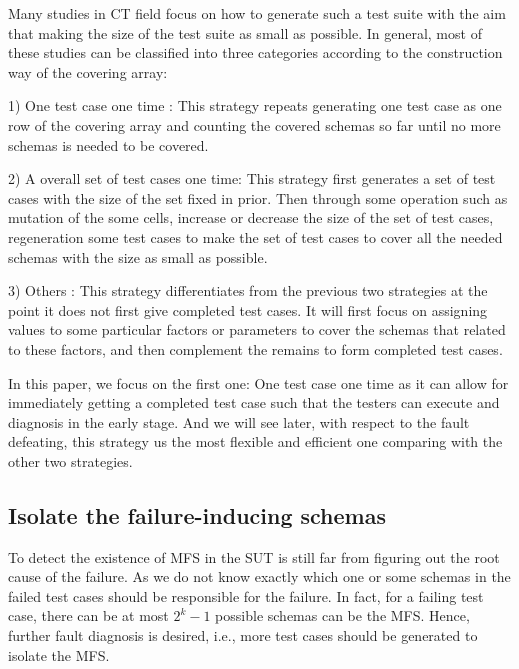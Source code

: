 \documentclass{sig-alternate}
\begin{document}
Many studies in CT field focus on how to generate such a test suite with the aim that making the size of the test suite as small as possible. In general, most of these studies can be classified into three categories according to the construction way of the covering array:

1) One test case one time : This strategy repeats generating one test case as one row of the covering array and counting the covered schemas so far until no more schemas is needed to be covered.


2) A overall set of test cases one time:  This strategy first generates a set of test cases with the size of the set fixed in prior. Then through some operation such as mutation of the some cells, increase or decrease the size of the set of test cases, regeneration some test cases to make the set of test cases to cover all the needed schemas with the size as small as possible.

3) Others :  This strategy differentiates from the previous two strategies at the point it does not first give completed test cases. It will first focus on assigning values to some  particular factors or parameters to cover the schemas that related to these factors, and then complement the remains to form completed test cases.

In this paper, we focus on the first one: One test case one time as it can allow for immediately getting a completed test case such that the testers can execute and diagnosis in the early stage. And we will see later, with respect to the fault defeating, this strategy us the most flexible and efficient one comparing with the other two strategies.

%

%
%
%


\subsection{Isolate the failure-inducing schemas}
To detect the existence of MFS in the SUT is still far from figuring out the root cause of the failure. As we do not know exactly which one or some schemas in the failed test cases should be responsible for the failure. In fact, for a failing test case, there can be at most $2^{k} - 1$ possible schemas can be the MFS. Hence, further fault diagnosis is desired, i.e., more test cases should be generated to isolate the MFS.
\end{document}
